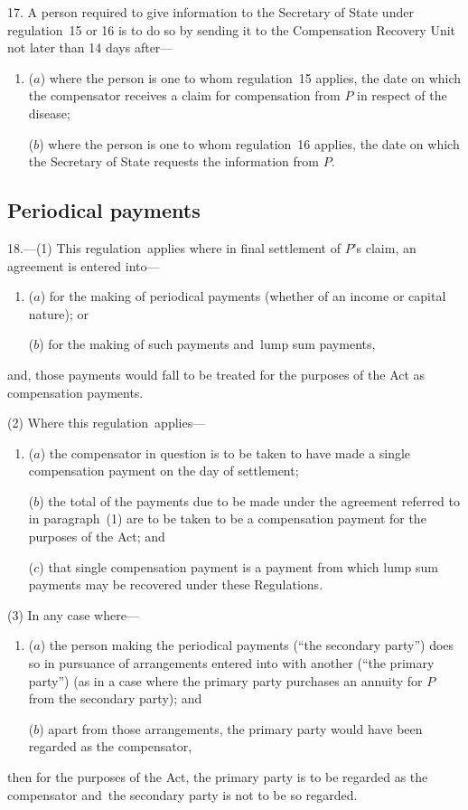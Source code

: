 \documentclass[12pt,a4paper]{article}
\begin{document}
17.  A person required to give information to the Secretary of State under regulation~15 or 16 is to do so by sending it to the Compensation Recovery Unit not later than 14 days after—
\begin{enumerate}\item[]
($a$) where the person is one to whom regulation~15 applies, the date on which the compensator receives a claim for compensation from $P$ in respect of the disease;

($b$) where the person is one to whom regulation~16 applies, the date on which the Secretary of State requests the information from $P$.
\end{enumerate}

\subsection[18. Periodical payments]{Periodical payments}

18.---(1)  This regulation~applies where in final settlement of $P$’s claim, an agreement is entered into—
\begin{enumerate}\item[]
($a$) for the making of periodical payments (whether of an income or capital nature); or

($b$) for the making of such payments and~lump sum payments,
\end{enumerate}
and, those payments would fall to be treated for the purposes of the Act as compensation payments.

(2) Where this regulation~applies—
\begin{enumerate}\item[]
($a$) the compensator in question is to be taken to have made a single compensation payment on the day of settlement;

($b$) the total of the payments due to be made under the agreement referred to in paragraph~(1) are to be taken to be a compensation payment for the purposes of the Act; and

($c$) that single compensation payment is a payment from which lump sum payments may be recovered under these Regulations.
\end{enumerate}

(3) In any case where—
\begin{enumerate}\item[]
($a$) the person making the periodical payments (“the secondary party”) does so in pursuance of arrangements entered into with another (“the primary party”) (as in a case where the primary party purchases an annuity for $P$ from the secondary party); and

($b$) apart from those arrangements, the primary party would have been regarded as the compensator,
\end{enumerate}
then for the purposes of the Act, the primary party is to be regarded as the compensator and~the secondary party is not to be so regarded.
\end{document}
